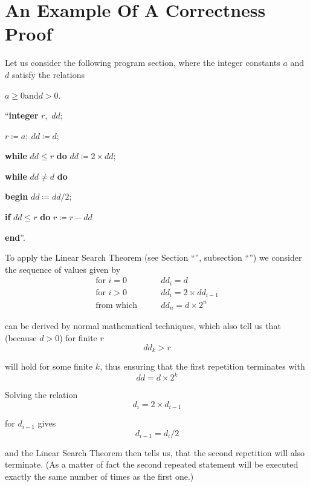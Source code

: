 \section[An example of a correctness proof]{An Example Of A Correctness Proof}

Let us consider the following program section, where the integer constants $a$ and $d$ satisfy the relations
\medskip

{
	\setlength{\parindent}{8em}
	$a \geqslant 0$\quad and\quad $d > 0$.
	
	\hspace{-.4em}``\textbf{integer} $r$,\ $dd$;
	
	$r \coloneq a;\ dd \coloneq d$;
	
	\textbf{while} $dd \leqslant r$ \textbf{do} $dd \coloneq 2\times dd;$
	
	\textbf{while} $dd \neq d$ \textbf{do}
	
	\quad \textbf{begin} $dd \coloneq dd/2;$
	
	\quad\quad \textbf{if} $dd \leqslant r$ \textbf{do} $r \coloneq r - dd$
	
	\quad\textbf{end}''.
}
\medskip

To apply the Linear Search Theorem (see Section ``'', subsection ``'') we consider the sequence of values given by
\begin{equation}
	\label{eq:example-initial}
	\begin{split}
		\text{for } i = 0\qquad & dd_i = d \\
		\text{for } i > 0\qquad & dd_i = 2\times dd_{i - 1}\\
		\text{from which}\qquad & dd_n = d\times 2^n
	\end{split}
\end{equation}


\noindent
can be derived by normal mathematical techniques, which also tell us that (because $d > 0$) for finite $r$
$$
dd_k > r
$$

\noindent
will hold for some finite $k$, thus ensuring that the first repetition terminates with
$$
dd = d\times 2^k
$$

Solving the relation
$$
d_i = 2\times d_{i-1}
$$

\noindent
for $d_{i-1}$ gives
$$
d_{i-1} = d_i/2
$$

\noindent
and the Linear Search Theorem then tells us, that the second repetition will also terminate. (As a matter of fact the second repeated statement will be executed exactly the same number of times as the first one.)

